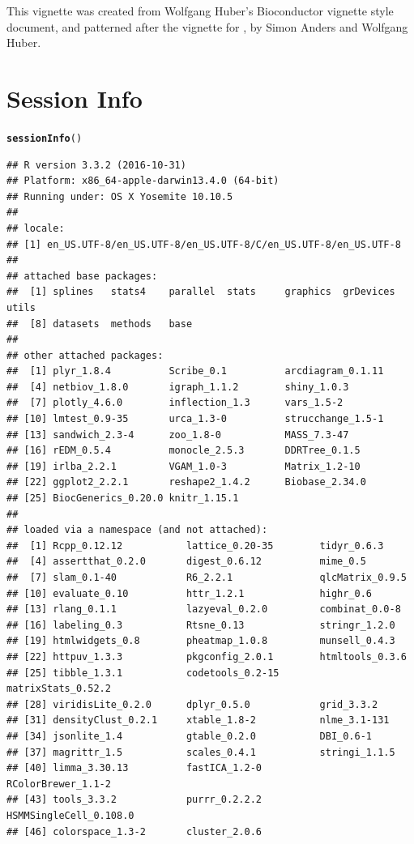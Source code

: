 \documentclass[10pt,oneside]{article}\usepackage[]{graphicx}\usepackage[]{color}
\makeatletter
\newcommand{\hlstd}[1]{\textcolor[rgb]{0.345,0.345,0.345}{#1}}%
\newcommand{\hlkwd}[1]{\textcolor[rgb]{0.737,0.353,0.396}{\textbf{#1}}}%
\newenvironment{kframe}{%
 \def\at@end@of@kframe{}%
 \ifinner\ifhmode%
  \def\at@end@of@kframe{\end{minipage}}%
  \begin{minipage}{\columnwidth}%
 \fi\fi%
 \def\FrameCommand##1{\hskip\@totalleftmargin \hskip-\fboxsep
 \colorbox{shadecolor}{##1}\hskip-\fboxsep
     \hskip-\linewidth \hskip-\@totalleftmargin \hskip\columnwidth}%
 \MakeFramed {\advance\hsize-\width
   \@totalleftmargin\z@ \linewidth\hsize
   \@setminipage}}%
 {\par\unskip\endMakeFramed%
 \at@end@of@kframe}
\newenvironment{knitrout}{}{} %
\makeatother
\begin{document}
This vignette was created from Wolfgang Huber's Bioconductor vignette style document, and patterned after the vignette for , by Simon Anders and Wolfgang Huber.

\section{Session Info}
\begin{knitrout}
\color{fgcolor}\begin{kframe}
\begin{alltt}
\hlkwd{sessionInfo}\hlstd{()}
\end{alltt}
\begin{verbatim}
## R version 3.3.2 (2016-10-31)
## Platform: x86_64-apple-darwin13.4.0 (64-bit)
## Running under: OS X Yosemite 10.10.5
## 
## locale:
## [1] en_US.UTF-8/en_US.UTF-8/en_US.UTF-8/C/en_US.UTF-8/en_US.UTF-8
## 
## attached base packages:
##  [1] splines   stats4    parallel  stats     graphics  grDevices utils    
##  [8] datasets  methods   base     
## 
## other attached packages:
##  [1] plyr_1.8.4          Scribe_0.1          arcdiagram_0.1.11  
##  [4] netbiov_1.8.0       igraph_1.1.2        shiny_1.0.3        
##  [7] plotly_4.6.0        inflection_1.3      vars_1.5-2         
## [10] lmtest_0.9-35       urca_1.3-0          strucchange_1.5-1  
## [13] sandwich_2.3-4      zoo_1.8-0           MASS_7.3-47        
## [16] rEDM_0.5.4          monocle_2.5.3       DDRTree_0.1.5      
## [19] irlba_2.2.1         VGAM_1.0-3          Matrix_1.2-10      
## [22] ggplot2_2.2.1       reshape2_1.4.2      Biobase_2.34.0     
## [25] BiocGenerics_0.20.0 knitr_1.15.1       
## 
## loaded via a namespace (and not attached):
##  [1] Rcpp_0.12.12           lattice_0.20-35        tidyr_0.6.3           
##  [4] assertthat_0.2.0       digest_0.6.12          mime_0.5              
##  [7] slam_0.1-40            R6_2.2.1               qlcMatrix_0.9.5       
## [10] evaluate_0.10          httr_1.2.1             highr_0.6             
## [13] rlang_0.1.1            lazyeval_0.2.0         combinat_0.0-8        
## [16] labeling_0.3           Rtsne_0.13             stringr_1.2.0         
## [19] htmlwidgets_0.8        pheatmap_1.0.8         munsell_0.4.3         
## [22] httpuv_1.3.3           pkgconfig_2.0.1        htmltools_0.3.6       
## [25] tibble_1.3.1           codetools_0.2-15       matrixStats_0.52.2    
## [28] viridisLite_0.2.0      dplyr_0.5.0            grid_3.3.2            
## [31] densityClust_0.2.1     xtable_1.8-2           nlme_3.1-131          
## [34] jsonlite_1.4           gtable_0.2.0           DBI_0.6-1             
## [37] magrittr_1.5           scales_0.4.1           stringi_1.1.5         
## [40] limma_3.30.13          fastICA_1.2-0          RColorBrewer_1.1-2    
## [43] tools_3.3.2            purrr_0.2.2.2          HSMMSingleCell_0.108.0
## [46] colorspace_1.3-2       cluster_2.0.6
\end{verbatim}
\end{kframe}
\end{knitrout}



\end{document}
